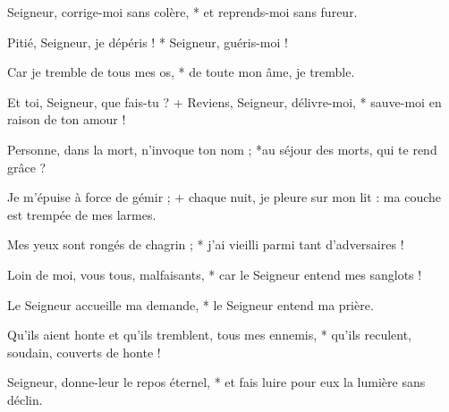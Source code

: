 \item Seigneur, corrige-moi sans colère, * et reprends-moi sans fureur.

\item Pitié, Seigneur, je dépéris ! * Seigneur, guéris-moi !

\item Car je tremble de tous mes os, * de toute mon âme, je tremble.

\item Et toi, Seigneur, que fais-tu ? + Reviens, Seigneur, délivre-moi, * sauve-moi en raison de ton amour !

\item Personne, dans la mort, n'invoque ton nom ; *au séjour des morts, qui te rend grâce ?

\item Je m'épuise à force de gémir ; + chaque nuit, je pleure sur mon lit : ma couche est trempée de mes larmes.

\item Mes yeux sont rongés de chagrin ; * j'ai vieilli parmi tant d'adversaires !

\item Loin de moi, vous tous, malfaisants, * car le Seigneur entend mes sanglots !

\item Le Seigneur accueille ma demande, * le Seigneur entend ma prière.

\item Qu'ils aient honte et qu'ils tremblent, tous mes ennemis, * qu'ils reculent, soudain, couverts de honte !

\item Seigneur, donne-leur le repos éternel, * et fais luire pour eux la lumière sans déclin.